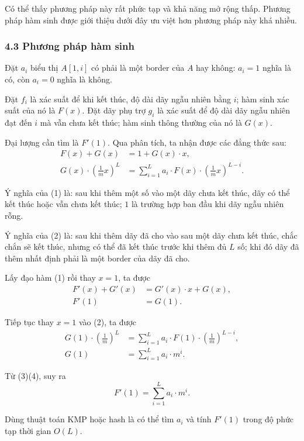 \documentclass[11pt]{article}
\begin{document}
Có thể thấy phương pháp này rất phức tạp và khả năng mở rộng thấp. Phương pháp
hàm sinh được giới thiệu dưới đây ưu việt hơn phương pháp này khá nhiều.

\subsubsection*{4.3 Phương pháp hàm sinh}

Đặt \(a_i\) biểu thị \(A[1,i]\) có phải là một border của \(A\) hay không:
\(a_i=1\) nghĩa là có, còn \(a_i=0\) nghĩa là không.

Đặt \(f_i\) là xác suất để khi kết thúc, độ dài dãy ngẫu nhiên bằng \(i\); hàm
sinh xác suất của nó là \(F(x)\). Đặt dãy phụ trợ \(g_i\) là xác suất để độ dài
dãy ngẫu nhiên đạt đến \(i\) mà vẫn chưa kết thúc; hàm sinh thông thường của nó
là \(G(x)\).

Đại lượng cần tìm là \(F'(1)\). Qua phân tích, ta nhận được các đẳng thức sau:
\begin{align}
  F(x)+G(x) &= 1+G(x)\cdot x, \tag{1}\\
  G(x)\cdot\left(\frac{1}{m}x\right)^L
    &= \sum_{i=1}^{L}a_i\cdot F(x)\cdot
       \left(\frac{1}{m}x\right)^{L-i}. \tag{2}
\end{align}

Ý nghĩa của (1) là: sau khi thêm một số vào một dãy chưa kết thúc, dãy có thể
kết thúc hoặc vẫn chưa kết thúc; \(1\) là trường hợp ban đầu khi dãy ngẫu nhiên
rỗng.

Ý nghĩa của (2) là: sau khi thêm dãy đã cho vào sau một dãy chưa kết thúc, chắc
chắn sẽ kết thúc, nhưng có thể đã kết thúc trước khi thêm đủ \(L\) số; khi đó
dãy đã thêm nhất định phải là một border của dãy đã cho.

Lấy đạo hàm (1) rồi thay \(x=1\), ta được
\begin{align}
  F'(x)+G'(x) &= G'(x)\cdot x+G(x),\\
  F'(1) &= G(1). \tag{3}
\end{align}

Tiếp tục thay \(x=1\) vào (2), ta được
\begin{align}
  G(1)\cdot\left(\frac{1}{m}\right)^L
    &= \sum_{i=1}^{L}a_i\cdot F(1)\cdot
       \left(\frac{1}{m}\right)^{L-i},\\
  G(1)&=\sum_{i=1}^{L}a_i\cdot m^i . \tag{4}
\end{align}

Từ (3)(4), suy ra
\[
  F'(1)=\sum_{i=1}^{L}a_i\cdot m^i .
\]

Dùng thuật toán KMP hoặc hash là có thể tìm \(a_i\) và tính \(F'(1)\) trong độ
phức tạp thời gian \(O(L)\).
\end{document}
